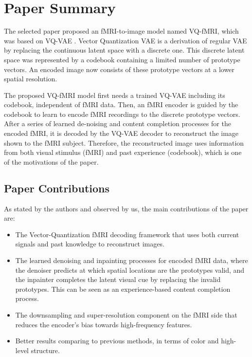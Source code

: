 \documentclass{article}
\theoremstyle{plain}
\theoremstyle{definition}
\theoremstyle{remark}
\begin{document}
\section{Paper Summary}
\label{submission}

The selected paper proposed an fMRI-to-image model named VQ-fMRI, which was based on VQ-VAE \cite{oordNeuralDiscreteRepresentation2018}. Vector Quantization VAE is a derivation of regular VAE by replacing the continuous latent space with a discrete one. This discrete latent space was represented by a codebook containing a limited number of prototype vectors. An encoded image now consists of these prototype vectors at a lower spatial resolution.

The proposed VQ-fMRI model first needs a trained VQ-VAE including its codebook, independent of fMRI data. Then, an fMRI encoder is guided by the codebook to learn to encode fMRI recordings to the discrete prototype vectors. After a series of learned de-noising and content completion processes for the encoded fMRI, it is decoded by the VQ-VAE decoder to reconstruct the image shown to the fMRI subject. Therefore, the reconstructed image uses information from both visual stimulus (fMRI) and past experience (codebook), which is one of the motivations of the paper.


\subsection{Paper Contributions}
As stated by the authors and observed by us, the main contributions of the paper are:
\begin{itemize}
\item The Vector-Quantization fMRI decoding framework that uses both current signals and past knowledge to reconstruct images.
\item The learned denoising and inpainting processes for encoded fMRI data, where the denoiser predicts at which spatial locations are the prototypes valid, and the inpainter completes the latent visual cue by replacing the invalid prototypes. This can be seen as an experience-based content completion  process.
\item The downsampling and super-resolution component on the fMRI side that reduces the encoder's bias towards high-frequency features.
\item Better results comparing to previous methods, in terms of color and high-level structure.
\end{itemize}
\end{document}
